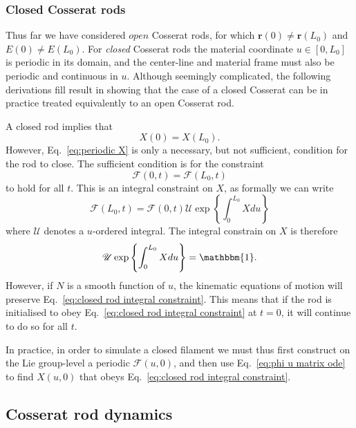 \subsubsection*{Closed Cosserat rods}

Thus far we have considered $\textit{open}$ Cosserat rods, for which $\mathbf{r}(0) \neq \mathbf{r}(L_0)$ and $E(0) \neq E(L_0)$. For \textit{closed} Cosserat rods the material coordinate $u \in [0, L_0]$ is periodic in its domain, and the center-line and material frame must also be periodic and continuous in $u$. Although seemingly complicated, the following derivations fill result in showing that the case of a closed Cosserat can be in practice treated equivalently to an open Cosserat rod.

A closed rod implies that
\begin{equation} \label{eq:periodic X}
X(0) = X(L_0).
\end{equation}
However, Eq.~\ref{eq:periodic X} is only a necessary, but not sufficient, condition for the rod to close. The sufficient condition is for the constraint
\begin{equation}
\mathcal{F}(0, t) = \mathcal{F}(L_0, t)
\end{equation}
to hold for all $t$. This is an integral constraint on $X$, as formally we can write
\begin{equation}
\mathcal{F}(L_0, t) = \mathcal{F}(0, t) \mathscr{U} \exp \left\{ \int_0^{L_0} X du  \right\}
\end{equation}
where $\mathscr{U}$ denotes a $u$-ordered integral. The integral constrain on $X$ is therefore
\begin{equation} \label{eq:closed rod integral constraint}
\mathscr{U} \exp \left\{ \int_0^{L_0} X du  \right\} = \mathbbm{1}.
\end{equation}
However, if $N$ is a smooth function of $u$, the kinematic equations of motion will preserve Eq.~\ref{eq:closed rod integral constraint}. This means that if the rod is initialised to obey Eq.~\ref{eq:closed rod integral constraint} at $t=0$, it will continue to do so for all $t$.

In practice, in order to simulate a closed filament we must thus first construct on the Lie group-level a periodic $\mathcal{F}(u, 0)$, and then use Eq.~\ref{eq:phi u matrix ode} to find $X(u, 0)$ that obeys Eq.~\ref{eq:closed rod integral constraint}.

\subsection{Cosserat rod dynamics} \label{sec:Cosserat rod dynamics}

